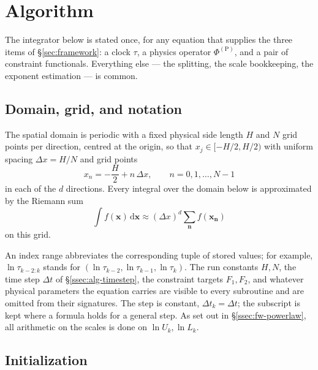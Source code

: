 \documentclass{article}
\begin{document}
\section{Algorithm}\label{sec:algorithm}

The integrator below is stated once, for any equation that supplies the three
items of \S\ref{sec:framework}: a clock $\tau$, a physics operator
$\Phi^{(\mathrm{P})}$, and a pair of constraint functionals. Everything else
--- the splitting, the scale bookkeeping, the exponent estimation --- is
common.

\subsection{Domain, grid, and notation}\label{ssec:alg-domain}

The spatial domain is periodic with a fixed physical side length $H$ and $N$
grid points per direction, centred at the origin, so that
$x_j \in [-H/2, H/2)$ with uniform spacing $\Delta x = H/N$ and grid points
\begin{equation}\label{eq:alg-grid}
  x_n = -\frac{H}{2} + n\, \Delta x, \qquad n = 0, 1, \dots, N-1
\end{equation}
in each of the $d$ directions. Every integral over the domain below is
approximated by the Riemann sum
\begin{equation}\label{eq:alg-riemann}
  \int f(\mathbf{x})\,\mathrm{d}\mathbf{x} \approx (\Delta x)^d \sum_{\mathbf{n}} f(\mathbf{x_n})
\end{equation}
on this grid.

An index range abbreviates the corresponding tuple of stored values; for
example, $\ln \tau_{k-2:k}$ stands for
$(\ln \tau_{k-2}, \ln \tau_{k-1}, \ln \tau_k)$. The run
constants $H, N$, the time step $\Delta t$ of \S\ref{ssec:alg-timestep}, the
constraint targets $F_1, F_2$, and whatever physical parameters the equation
carries are visible to every subroutine and are omitted from their signatures.
The step is constant, $\Delta t_k = \Delta t$; the subscript is kept where a
formula holds for a general step. As set out in \S\ref{ssec:fw-powerlaw}, all
arithmetic on the scales is done on $\ln U_k, \ln L_k$.

\subsection{Initialization}\label{ssec:alg-init}
\end{document}
